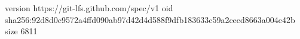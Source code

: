 version https://git-lfs.github.com/spec/v1
oid sha256:92d8d0c9572a4ffd090ab97d42d4d588f9dfb183633c59a2ceed8663a004e42b
size 6811
